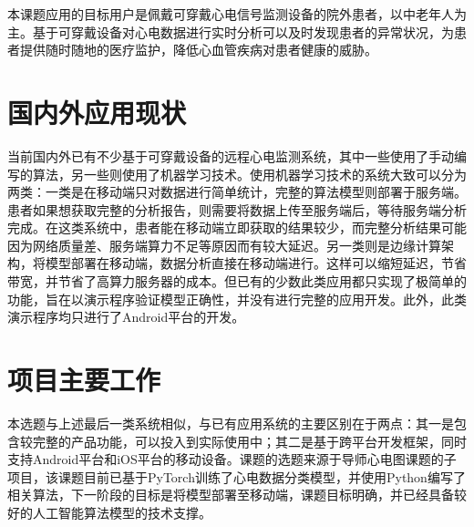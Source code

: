 \documentclass{ecnuthesis}
\begin{document}
    本课题应用的目标用户是佩戴可穿戴心电信号监测设备的院外患者，以中老年人为主。基于可穿戴设备对心电数据进行实时分析可以及时发现患者的异常状况，为患者提供随时随地的医疗监护，降低心血管疾病对患者健康的威胁。


    \section{国内外应用现状}\label{sec:status}
    当前国内外已有不少基于可穿戴设备的远程心电监测系统，其中一些使用了手动编写的算法\cite{zhengJiyukechuandaishebeideyidongjianhuAPP2019,wuYidongxindianjiancexitongdeyanjiuyushixian2018,chenYidongxindianxinxijianhuxitongjixindianjiancesuanfadeyanjiu2018,heJiyuyidongpingtaidexindianjianceyiliaoxitongdeshixian2017,gradlRealtimeECGMonitoring2012,wenRealtimeECGTelemonitoring2008}，另一些则使用了机器学习技术。使用机器学习技术的系统大致可以分为两类：一类是在移动端只对数据进行简单统计，完整的算法模型则部署于服务端\cite{wangJiyushenduxuexideyidongyuanchengxindianjiancexitongshejiyushixian2020,singhSmartECGMonitoring2022}。患者如果想获取完整的分析报告，则需要将数据上传至服务端后，等待服务端分析完成。在这类系统中，患者能在移动端立即获取的结果较少，而完整分析结果可能因为网络质量差、服务端算力不足等原因而有较大延迟。另一类则是边缘计算架构，将模型部署在移动端，数据分析直接在移动端进行\cite{chenJiyushenduxuexidexindianfenximoxingdeshejiyuyouhua2021,liuJiyuyidongzhongduanfenxidekechuandairouxingxindianjiancexitong2021,wangEnablingSmartPersonalized2014,jinPredictingCardiovascularDisease2009}。这样可以缩短延迟，节省带宽，并节省了高算力服务器的成本。但已有的少数此类应用都只实现了极简单的功能，旨在以演示程序验证模型正确性，并没有进行完整的应用开发。此外，此类演示程序均只进行了Android平台的开发。


    \section{项目主要工作}\label{sec:work}
    本选题与上述最后一类系统相似，与已有应用系统的主要区别在于两点：其一是包含较完整的产品功能，可以投入到实际使用中；其二是基于跨平台开发框架，同时支持Android平台和iOS平台的移动设备。课题的选题来源于导师心电图课题的子项目，该课题目前已基于PyTorch训练了心电数据分类模型，并使用Python编写了相关算法，下一阶段的目标是将模型部署至移动端，课题目标明确，并已经具备较好的人工智能算法模型的技术支撑。
\end{document}
